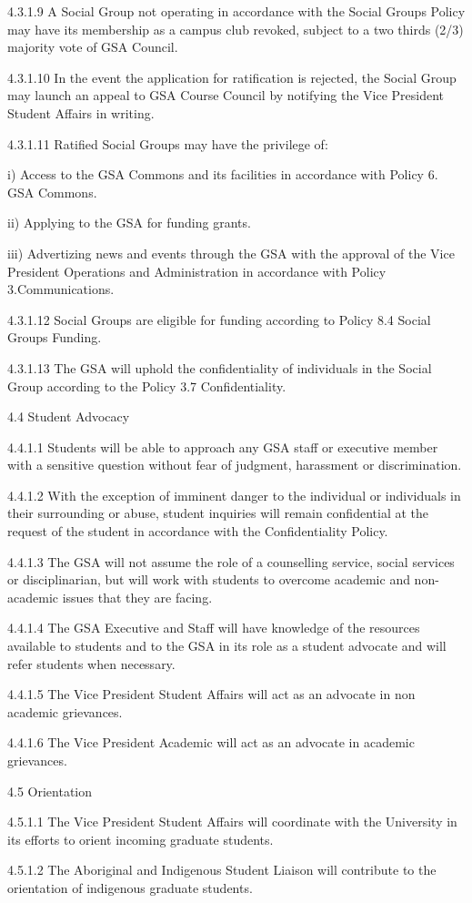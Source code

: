  4.3.1.9 A Social Group not operating in accordance with the Social Groups Policy may have its membership as a campus club revoked, subject to a two thirds (2/3) majority vote of GSA  Council.
 
 4.3.1.10 In the event the application for ratification is rejected, the Social Group may launch an appeal to GSA Course Council by notifying the Vice President Student Affairs in writing. 
 
 4.3.1.11 Ratified Social Groups may have the privilege of: 
 
 i) Access to the GSA Commons and its facilities in accordance with Policy 6. GSA Commons. 
 
 ii) Applying to the GSA for funding grants. 
 
 iii) Advertizing news and events through the GSA with the approval of the Vice President Operations and Administration in accordance with Policy 3.Communications. 
 
 4.3.1.12 Social Groups are eligible for funding according to Policy 8.4 Social Groups Funding. 
 
 4.3.1.13 The GSA will uphold the confidentiality of individuals in the Social Group according to the Policy 3.7 Confidentiality. 
  
 4.4 Student Advocacy 
 
 4.4.1.1 Students will be able to approach any GSA staff or executive member with a sensitive question without fear of judgment, harassment or discrimination. 
 
 4.4.1.2 With the exception of imminent danger to the individual or individuals in their surrounding or abuse, student inquiries will remain confidential at the request of the student in accordance with the Confidentiality Policy. 
 
 4.4.1.3 The GSA will not assume the role of a counselling service, social services or disciplinarian, but will work with students to overcome academic and non-academic issues that they are facing. 
 
 4.4.1.4 The GSA Executive and Staff will have knowledge of the resources available to students and to the GSA in its role as a student advocate and will refer students when necessary. 
 
 4.4.1.5 The Vice President Student Affairs will act as an advocate in non academic grievances. 
 
 4.4.1.6 The Vice President Academic will act as an advocate in academic grievances. 
 
 4.5 Orientation 
 
 4.5.1.1 The Vice President Student Affairs will coordinate with the University in its efforts to orient incoming graduate students. 
 
 4.5.1.2 The Aboriginal and Indigenous Student Liaison will contribute to the orientation of indigenous graduate students. 